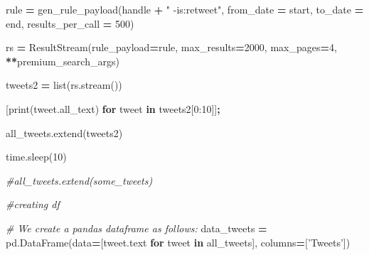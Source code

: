 \documentclass[12pt,twoside]{reedthesis}
\newenvironment{Shaded}{\begin{snugshade}}{\end{snugshade}}
\newcommand{\KeywordTok}[1]{\textcolor[rgb]{0.13,0.29,0.53}{\textbf{#1}}}
\newcommand{\DecValTok}[1]{\textcolor[rgb]{0.00,0.00,0.81}{#1}}
\newcommand{\StringTok}[1]{\textcolor[rgb]{0.31,0.60,0.02}{#1}}
\newcommand{\CommentTok}[1]{\textcolor[rgb]{0.56,0.35,0.01}{\textit{#1}}}
\newcommand{\ControlFlowTok}[1]{\textcolor[rgb]{0.13,0.29,0.53}{\textbf{#1}}}
\newcommand{\OperatorTok}[1]{\textcolor[rgb]{0.81,0.36,0.00}{\textbf{#1}}}
\newcommand{\BuiltInTok}[1]{#1}
\newcommand{\NormalTok}[1]{#1}
\begin{document}
\begin{Shaded}
\begin{Highlighting}[]
\NormalTok{        rule }\OperatorTok{=}\NormalTok{ gen_rule_payload(handle }\OperatorTok{+} \StringTok{" -is:retweet"}\NormalTok{,}
\NormalTok{                                from_date }\OperatorTok{=}\NormalTok{ start,}
\NormalTok{                                to_date }\OperatorTok{=}\NormalTok{ end,}
\NormalTok{                                results_per_call }\OperatorTok{=} \DecValTok{500}\NormalTok{)}
            
\NormalTok{        rs }\OperatorTok{=}\NormalTok{ ResultStream(rule_payload}\OperatorTok{=}\NormalTok{rule,}
\NormalTok{                          max_results}\OperatorTok{=}\DecValTok{2000}\NormalTok{,}
\NormalTok{                          max_pages}\OperatorTok{=}\DecValTok{4}\NormalTok{,}
                          \OperatorTok{**}\NormalTok{premium_search_args)}

\NormalTok{        tweets2 }\OperatorTok{=} \BuiltInTok{list}\NormalTok{(rs.stream())}

\NormalTok{        [}\BuiltInTok{print}\NormalTok{(tweet.all_text) }\ControlFlowTok{for}\NormalTok{ tweet }\KeywordTok{in}\NormalTok{ tweets2[}\DecValTok{0}\NormalTok{:}\DecValTok{10}\NormalTok{]]}\OperatorTok{;}
        
\NormalTok{        all_tweets.extend(tweets2)}
        
\NormalTok{        time.sleep(}\DecValTok{10}\NormalTok{)}
        
    \CommentTok{#all_tweets.extend(some_tweets)}
        
        
        
    \CommentTok{#creating df    }
    
    
    
    \CommentTok{# We create a pandas dataframe as follows:}
\NormalTok{    data_tweets }\OperatorTok{=}\NormalTok{ pd.DataFrame(data}\OperatorTok{=}\NormalTok{[tweet.text }\ControlFlowTok{for}\NormalTok{ tweet }\KeywordTok{in}\NormalTok{ all_tweets], }
\NormalTok{    columns}\OperatorTok{=}\NormalTok{[}\StringTok{'Tweets'}\NormalTok{])}
    

\end{Highlighting}
\end{Shaded}
\end{document}
